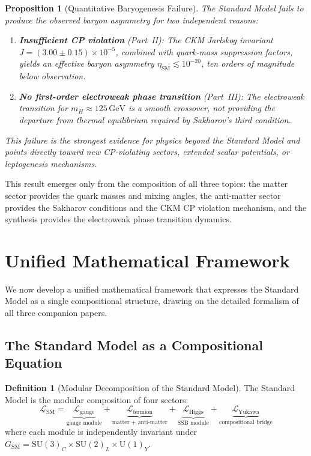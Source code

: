\documentclass[12pt]{article}
\newtheorem{proposition}[theorem]{Proposition}
\theoremstyle{definition}
\newtheorem{definition}[theorem]{Definition}
\theoremstyle{remark}
\newcommand{\Lagr}{\mathcal{L}}
\newcommand{\GeV}{\,\mathrm{GeV}}
\newcommand{\su}[1]{\mathrm{SU}(#1)}
\newcommand{\uu}[1]{\mathrm{U}(#1)}
\begin{document}
\begin{proposition}[Quantitative Baryogenesis Failure]
\label{prop:baryogenesis-failure}
The Standard Model fails to produce the observed baryon asymmetry for two independent reasons:
\begin{enumerate}
\item \textbf{Insufficient CP violation} (Part~II): The CKM Jarlskog invariant $J = (3.00 \pm 0.15) \times 10^{-5}$, combined with quark-mass suppression factors, yields an effective baryon asymmetry $\eta_{\mathrm{SM}} \lesssim 10^{-20}$, ten orders of magnitude below observation.
\item \textbf{No first-order electroweak phase transition} (Part~III): The electroweak transition for $m_H \approx 125\GeV$ is a smooth crossover, not providing the departure from thermal equilibrium required by Sakharov's third condition.
\end{enumerate}
This failure is the strongest evidence for physics beyond the Standard Model and points directly toward new CP-violating sectors, extended scalar potentials, or leptogenesis mechanisms.
\end{proposition}

This result emerges only from the composition of all three topics: the matter sector provides the quark masses and mixing angles, the anti-matter sector provides the Sakharov conditions and the CKM CP violation mechanism, and the synthesis provides the electroweak phase transition dynamics.


\section{Unified Mathematical Framework}
\label{sec:unified-framework}

We now develop a unified mathematical framework that expresses the Standard Model as a single compositional structure, drawing on the detailed formalism of all three companion papers.

\subsection{The Standard Model as a Compositional Equation}

\begin{definition}[Modular Decomposition of the Standard Model]
\label{def:modular-decomposition}
The Standard Model is the modular composition of four sectors:
\begin{equation}
\label{eq:sm-composition}
\boxed{\Lagr_{\mathrm{SM}} = \underbrace{\Lagr_{\mathrm{gauge}}}_{\text{gauge module}} + \underbrace{\Lagr_{\mathrm{fermion}}}_{\text{matter + anti-matter}} + \underbrace{\Lagr_{\mathrm{Higgs}}}_{\text{SSB module}} + \underbrace{\Lagr_{\mathrm{Yukawa}}}_{\text{compositional bridge}}}
\end{equation}
where each module is independently invariant under $G_{\mathrm{SM}} = \su{3}_C \times \su{2}_L \times \uu{1}_Y$.
\end{definition}
\end{document}
